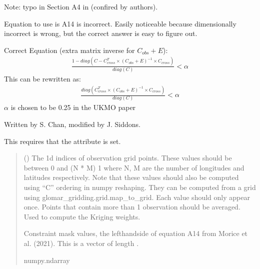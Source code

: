 \documentclass[letterpaper,10pt,english]{sphinxmanual}
\begin{document}
\begin{fulllineitems}
\begin{fulllineitems}
\sphinxAtStartPar
Note: typo in Section A4 in  (confired by authors).

\sphinxAtStartPar
Equation to use is A14 is incorrect. Easily noticeable because
dimensionally incorrect is wrong, but the correct answer is easy to
figure out.

\sphinxAtStartPar
Correct Equation (extra matrix inverse for \(C_{obs} + E\)):
\begin{equation*}
\begin{split}\frac{
    1 - diag(C - C_{cross}^T \times (C_{obs} + E)^{-1}
             \times C_{cross})
}{diag(C)} < \alpha\end{split}
\end{equation*}
\sphinxAtStartPar
This can be re\sphinxhyphen{}written as:
\begin{equation*}
\begin{split}\frac{
    diag(C_{cross}^T \times (C_{obs} + E)^{-1} \times C_{cross})
}{diag(C)} < \alpha\end{split}
\end{equation*}
\sphinxAtStartPar
\(\alpha\) is chosen to be 0.25 in the UKMO paper

\sphinxAtStartPar
Written by S. Chan, modified by J. Siddons.

\sphinxAtStartPar
This requires that the  attribute is set.
\begin{quote}\begin{description}
\sphinxAtStartPar
{} () \textendash{} The 1d indices of observation grid points. These values should be
between 0 and (N * M) \sphinxhyphen{} 1 where N, M are the number of longitudes
and latitudes respectively. Note that these values should also be
computed using “C” ordering in numpy reshaping. They can be
computed from a grid using glomar\_gridding.grid.map\_to\_grid. Each
value should only appear once. Points that contain more than 1
observation should be averaged. Used to compute the Kriging weights.

\sphinxAtStartPar
{} \textendash{} Constraint mask values, the left\sphinxhyphen{}hand\sphinxhyphen{}side of equation A14 from
Morice et al. (2021). This is a vector of length .

\sphinxAtStartPar
numpy.ndarray


\end{description}
\end{quote}
\end{fulllineitems}
\end{fulllineitems}
\end{document}
